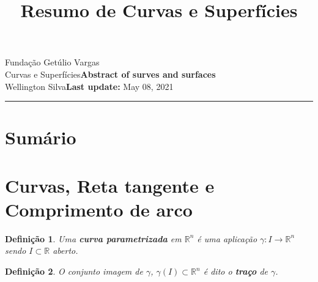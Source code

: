 \documentclass{article}
\title{Resumo de Curvas e Superfícies}
\author{}
\date{}
\newtheorem{definition}{Definição}
\newcommand{\assignment}{Abstract of surves and surfaces}
\newcommand{\duedate}{May 08, 2021}
\begin{document}
Fundação Getúlio Vargas\hfill\\
Curvas e Superfícies\hfill\textbf{\assignment}\\
Wellington Silva\hfill\textbf{Last update:} \duedate\\
\smallskip\hrule\bigskip

{\let\newpage\relax\maketitle}
\maketitle

\section*{Sumário}

\textbf{}
\vspace{4.0mm}

\textbf{}
\vspace{4.0mm}

\textbf{}
\vspace{4.0mm}

\textbf{}
\vspace{4.0mm}

\textbf{}
\vspace{4.0mm}

\textbf{}
\vspace{4.0mm}

\textbf{}
\vspace{4.0mm}

\newpage

\section*{Curvas, Reta tangente e Comprimento de arco}
\label{s1}

\begin{definition}
Uma \textbf{curva parametrizada} em $\mathbb{R}^n$ é uma aplicação $\gamma: I \rightarrow \mathbb{R}^n$ sendo $I \subset \mathbb{R}$ aberto.
\end{definition}

\begin{definition}
O conjunto imagem de $\gamma$, $\gamma(I) \subset \mathbb{R}^n$ é dito o \textbf{traço} de $\gamma$.
\end{definition}
\end{document}
